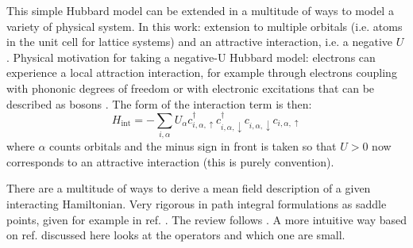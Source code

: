 \documentclass[../notes.tex]{subfiles}
\begin{document}
This simple Hubbard model can be extended in a multitude of ways to model a variety of physical system.
In this work: extension to multiple orbitals (i.e. atoms in the unit cell for lattice systems) and an attractive interaction, i.e. a negative \(U\).
Physical motivation for taking a negative-U Hubbard model: electrons can experience a local attraction interaction, for example through electrons coupling with phononic degrees of freedom or with electronic excitations that can be described as bosons \cite{micnasSuperconductivityNarrowbandSystems1990}.
The form of the interaction term is then: 
\begin{equation}
	H_{\mathrm{int}} = -\sum_{i, \alpha} U_{\alpha} c_{i, \alpha, \uparrow}^{\dagger} c_{i, \alpha, \downarrow}^{\dagger} c_{i, \alpha, \downarrow} c_{i, \alpha, \uparrow}
	\label{eq:Hubbard interaction multiband}
\end{equation}
where \(\alpha\) counts orbitals and the minus sign in front is taken so that \(U > 0\) now corresponds to an attractive interaction (this is purely convention).

There are a multitude of ways to derive a mean field description of a given interacting Hamiltonian.
Very rigorous in path integral formulations as saddle points, given for example in ref. \cite{colemanIntroductionManyBodyPhysics2015}.
The review follows \cite{huhtinenSuperconductivityNormalState2023}.
A more intuitive way based on ref. \cite{bruusManyBodyQuantumTheory2004} discussed here looks at the operators and which one are small. 
\end{document}
